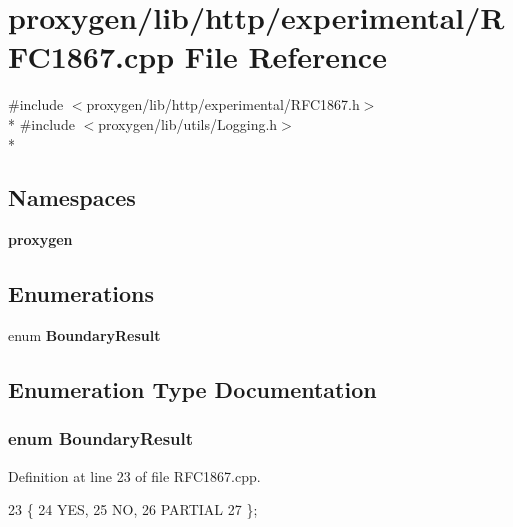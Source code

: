 \section{proxygen/lib/http/experimental/\+R\+F\+C1867.cpp File Reference}
\label{RFC1867_8cpp}
{\ttfamily \#include $<$proxygen/lib/http/experimental/\+R\+F\+C1867.\+h$>$}\\*
{\ttfamily \#include $<$proxygen/lib/utils/\+Logging.\+h$>$}\\*
\subsection*{Namespaces}
\begin{DoxyCompactItemize}
\item 
 {\bf proxygen}
\end{DoxyCompactItemize}
\subsection*{Enumerations}
\begin{DoxyCompactItemize}
\item 
enum {\bf Boundary\+Result} 
\end{DoxyCompactItemize}


\subsection{Enumeration Type Documentation}
\subsubsection[{Boundary\+Result}]{\setlength{\rightskip}{0pt plus 5cm}enum {\bf Boundary\+Result}\hspace{0.3cm}{\ttfamily [strong]}}\label{RFC1867_8cpp_ab3066672d90dc4e15f7f32f3f073d916}


Definition at line 23 of file R\+F\+C1867.\+cpp.


\begin{DoxyCode}
23                           \{
24   YES,
25   NO,
26   PARTIAL
27 \};
\end{DoxyCode}
